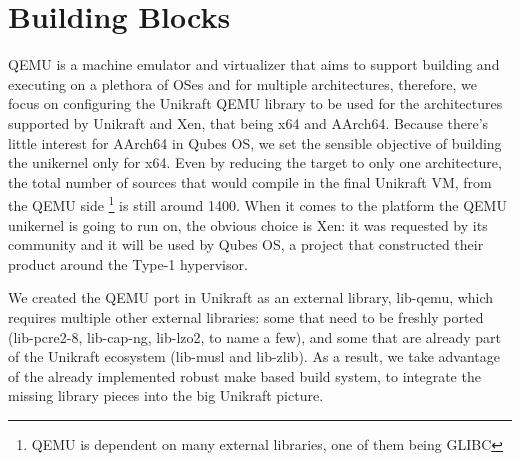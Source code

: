 \chapter{Building Blocks}
\label{chapter:building-blocks}

QEMU \cite{qemu} is a machine emulator and virtualizer that aims to support building and executing on a plethora of OSes and for multiple architectures, therefore, we focus on configuring the Unikraft QEMU library to be used for the architectures supported by Unikraft and Xen, that being x64 and AArch64.
Because there's little interest for AArch64 in Qubes OS, we set the sensible objective of building the unikernel only for x64.
Even by reducing the target to only one architecture, the total number of sources that would compile in the final Unikraft VM, from the QEMU side \footnote{QEMU is dependent on many external libraries, one of them being GLIBC} is still around 1400.
When it comes to the platform the QEMU unikernel is going to run on, the obvious choice is Xen: it was requested by its community and it will be used by Qubes OS, a project that constructed their product around the Type-1 hypervisor.

We created the QEMU port in Unikraft as an external library, lib-qemu, which requires multiple other external libraries: some that need to be freshly ported (lib-pcre2-8, lib-cap-ng, lib-lzo2, to name a few), and some that are already part of the Unikraft ecosystem (lib-musl and lib-zlib).
As a result, we take advantage of the already implemented robust make based build system, to integrate the missing library pieces into the big Unikraft picture.
